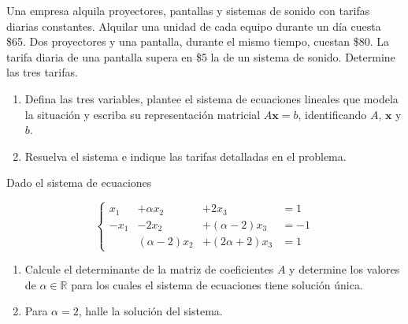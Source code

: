 \documentclass[10pt,a4]{examenEPN0}
\begin{document}
\encabezado
{}
\indicacionesPrueba
\begin{preguntas}



\item Una empresa alquila proyectores, pantallas y sistemas de sonido con tarifas diarias constantes. Alquilar una unidad de cada equipo durante un día cuesta \$65. Dos proyectores y una pantalla, durante el mismo tiempo, cuestan \$80. La tarifa diaria de una pantalla supera en \$5 la de un sistema de sonido. Determine las tres tarifas.

\begin{enumerate}
    \item Defina las tres variables, plantee el sistema de ecuaciones lineales que modela la situación y escriba su representación matricial $A\mathbf{x}=b$, identificando $A$, $\mathbf{x}$ y $b$. 
    \item Resuelva el sistema e indique las tarifas detalladas en el problema. 
\end{enumerate}
\newpage

\small
\item Dado el sistema de ecuaciones

$$
    \left\{
    \begin{alignedat}{4}
        x_1  & + \alpha x_2       & + 2x_3              &= 1 \\
        -x_1 & - 2x_2             & + (\alpha -2)x_3    &= -1 \\
             & (\alpha - 2) x_2   & + (2\alpha +2)x_3  &= 1
    \end{alignedat}
    \right.
$$
\begin{enumerate}
    \item Calcule el determinante de la matriz de coeficientes $A$ y determine los valores de $\alpha\in\mathbb{R}$ para los cuales el sistema de ecuaciones tiene solución única. 
    \item Para $\alpha=2$, halle la solución del sistema.  
\end{enumerate}
\newpage



\end{preguntas}
\end{document}

